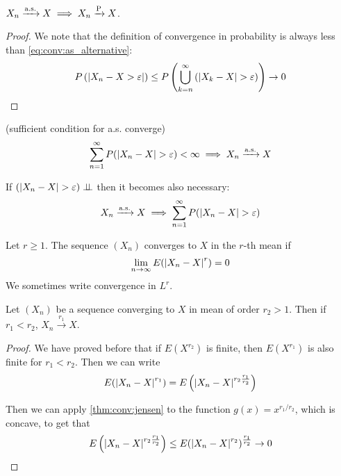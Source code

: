 \documentclass[12pt]{extarticle}
\newcommand{\convas}{\xrightarrow{\operatorfont a.s.}}
\newcommand{\convprob}{\xrightarrow{\operatorfont P}}
\begin{document}
\begin{theorem}
    $X_n \convas X \implies X_n \convprob X$.
\end{theorem}
\begin{proof}
    We note that the definition of convergence in probability is always less than \autoref{eq:conv:as_alternative}:
    \begin{equation}
        P\left(\abs{X_n - X > \varepsilon}\right) \leq P\left(\bigcup_{k = n}^\infty \left( \abs{X_k - X} > \varepsilon \right)\right) \to 0
    \end{equation}
\end{proof}

\begin{theorem}(sufficient condition for a.s. converge)
    \begin{equation}
        \sum_{n = 1}^\infty P(\abs{X_n - X} > \varepsilon) < \infty \implies X_n \convas X
    \end{equation}

    If $(\abs{X_n - X} > \varepsilon) \perp \!\!\! \perp$ then it becomes also necessary:
    \begin{equation}
        X_n \convas X \implies \sum_{n = 1}^\infty P(\abs{X_n - X} > \varepsilon)
    \end{equation}
\end{theorem}

\begin{definition}
    Let $r \geq 1$.
    The sequence $(X_n)$ converges to $X$ in the $r$-th mean if
    \begin{equation}
        \lim_{n \to \infty} E(\abs{X_n - X}^r) = 0
    \end{equation}
    We sometimes write convergence in $L^r$.
\end{definition}

\begin{theorem}
    Let $(X_n)$ be a sequence converging to $X$ in mean of order $r_2 > 1$.
    Then if $r_1 < r_2$, $X_n \stackrel{r_1}{\to} X$.
\end{theorem}
\begin{proof}
    We have proved before that if $E(X^{r_2})$ is finite, then $E(X^{r_1})$ is also finite for $r_1 < r_2$.
    Then we can write
    \begin{equation}
        E(\abs{X_n - X}^{r_1}) = E\left(\abs{X_n - X}^{r_2 \frac{r_1}{r_2}}\right)
    \end{equation}

    Then we can apply \autoref{thm:conv:jensen} to the function $g(x) = x^{r_1/r_2}$, which is concave, to get that
    \begin{equation}
        E\left(\abs{X_n - X}^{r_2 \frac{r_1}{r_2}}\right) \leq E(\abs{X_n - X}^{r_2})^\frac{r_1}{r_2} \to 0
    \end{equation}
\end{proof}
\end{document}
